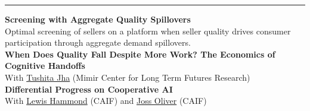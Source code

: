 \hrule %
\vspace{3mm}
\justifying
    \textbf{Screening with Aggregate Quality Spillovers} \\[3pt]
    Optimal screening of sellers on a platform when seller quality drives consumer participation through aggregate demand spillovers. \\[10pt]
    \noindent \textbf{When Does Quality Fall Despite More Work? The Economics of Cognitive Handoffs} \\[3pt]
    With \href{https://scholar.google.com/citations?user=sDpnXloAAAAJ&hl=en}{Tushita Jha} (Mimir Center for Long Term Futures Research) \\[10pt]
    \noindent \textbf{Differential Progress on Cooperative AI} \\[3pt]
    With \href{https://lewishammond.com/}{Lewis Hammond} (CAIF) and \href{https://www.linkedin.com/in/joss-oliver-3a49a42b1/}{Joss Oliver} (CAIF) \\[3pt]
